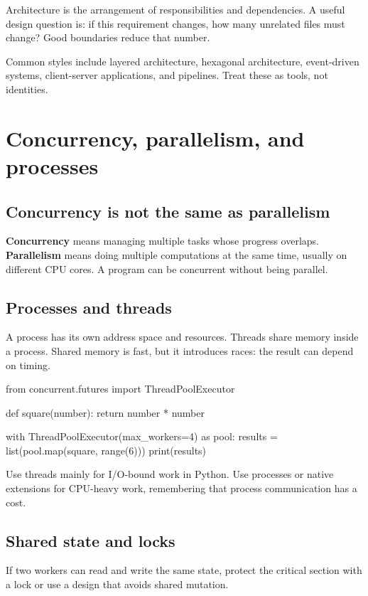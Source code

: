 \documentclass[11pt,openany,oneside]{book}
\newcommand{\term}[1]{\textbf{#1}\index{#1}}
\begin{document}
Architecture is the arrangement of responsibilities and dependencies. A useful design question is: if this requirement changes, how many unrelated files must change? Good boundaries reduce that number.

Common styles include layered architecture, hexagonal architecture, event-driven systems, client-server applications, and pipelines. Treat these as tools, not identities.

\chapter{Concurrency, parallelism, and processes}

\section{Concurrency is not the same as parallelism}

\term{Concurrency} means managing multiple tasks whose progress overlaps. \term{Parallelism} means doing multiple computations at the same time, usually on different CPU cores. A program can be concurrent without being parallel.

\section{Processes and threads}

A process has its own address space and resources. Threads share memory inside a process. Shared memory is fast, but it introduces races: the result can depend on timing.

\begin{code}[language=Python]
from concurrent.futures import ThreadPoolExecutor

def square(number):
    return number * number

with ThreadPoolExecutor(max_workers=4) as pool:
    results = list(pool.map(square, range(6)))
print(results)
\end{code}

Use threads mainly for I/O-bound work in Python. Use processes or native extensions for CPU-heavy work, remembering that process communication has a cost.

\section{Shared state and locks}

If two workers can read and write the same state, protect the critical section with a lock or use a design that avoids shared mutation.
\end{document}

